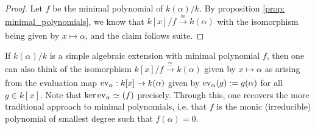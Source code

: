             \begin{proof}
                Let $f$ be the minimal polynomial of $k(\alpha)/k$. By proposition \ref{prop: minimal_polynomials}, we know that $k[x]/f \xrightarrow[]{\cong} k(\alpha)$ with the isomorphism being given by $x \mapsto \alpha$, and the claim follows suite.
            \end{proof}
        \begin{remark} \label{remark: minimal_polynomials_via_evaluations}
            If $k(\alpha)/k$ is a simple algebraic extension with minimal polynomial $f$, then one can also think of the isomorphism $k[x]/f \xrightarrow[]{\cong} k(\alpha)$ given by $x \mapsto \alpha$ as arising from the evaluation map $\mathrm{ev}_{\alpha}: k[x] \to k(\alpha)$ given by $\mathrm{ev}_{\alpha}(g) := g(\alpha)$ for all $g \in k[x]$. Note that $\ker \mathrm{ev}_{\alpha} \simeq (f)$ precisely. Through this, one recovers the more traditional approach to minimal polynomials, i.e. that $f$ is the monic (irreducible) polynomial of smallest degree such that $f(\alpha) = 0$.
        \end{remark}
        
